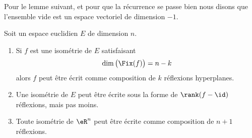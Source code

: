 Pour le lemme suivant, et pour que la récurrence se passe bien nous disons que l'ensemble vide est un espace vectoriel de dimension \( -1\).
\begin{lemma}       \label{LEMooJCDRooGAmlwp}
	Soit un espace euclidien \( E\) de dimension \( n\).
	\begin{enumerate}
		\item       \label{ITEMooFYEDooIJZBjP}
		      Si \( f\) est une isométrie de \( E\) satisfaisant
		      \begin{equation}
			      \dim\big( \Fix(f) \big)=n-k
		      \end{equation}
		      alors \( f\) peut être écrit comme composition de \( k\) réflexions hyperplanes.
		\item       \label{ITEMooJTZVooWvyfDD}
		      Une isométrie de \( E\) peut être écrite sous la forme de \( \rank(f-\id)\) réflexions, mais pas moins.
		\item       \label{ITEMooUCZWooSbyPwt}
		      Toute isométrie de \( \eR^n\) peut être écrite comme composition de \( n+1\) réflexions.
	\end{enumerate}
\end{lemma}

